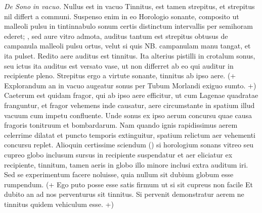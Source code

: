 \pstart [97 v\textsuperscript{o}]  \textit{De Sono}\protect{}\textit{ in vacuo.} Nullus est  in vacuo Tinnitus, est tamen strepitus, et strepitus  nil differt a communi. Suspenso enim in eo Horologio\protect{} sonante,  composito ut malleoli pulsu  in tintinnabulo sonum\protect{} certis distinctum intervallis  per semihoram ederet; , sed aure vitro admota, auditus tantum  est strepitus obtusus de campanula malleoli pulsu  ortus, velut si quis NB. campanulam manu tangat, et ita pulset. Redito aere auditus est tinnitus. Ita alterius pistilli in crotalum sonus\protect{}, seu  ictus ita auditus est versato vase, ut non differret  ab eo qui auditur in recipiente pleno. Strepitus  ergo a virtute sonante, tinnitus ab ipso aere.  (+ Explorandum an in vacuo augeatur sonus\protect{}  per Tubum Morlandi\protect{} exiguo sumto. +) Caeterum  est quidam fragor, qui ab ipso aere efficitur,  ut cum Lagenae quadratae franguntur, et fragor vehemens inde causatur, aere circumstante in spatium  illud vacuum cum impetu confluente. Unde sonus\protect{}  ex ipso aerum concursu quae causa fragoris tonitruum et bombardarum. Nam quando ignis rapidissimus aerem celerrime dilatat et puncto  temporis extinguitur, spatium relictum aer vehementi concursu replet. Alioquin certissime sciendum  (\Denarius ) si horologium\protect{} sonans vitreo seu cupreo globo  inclusum sursus in recipiente suspendatur et  aer eliciatur ex recipiente, tinnitum, tamen  aeris in globo illo minore inclusi extra auditum  iri. Sed se experimentum facere noluisse, quia  nullum sit dubium globum esse rumpendum. (+ Ego  puto posse esse satis firmum ut si sit cupreus  non facile  Et dubito an ad  nos perventurus sit tinnitus. Si pervenit  demonstratur aerem ne tinnitus quidem vehiculum esse. +)\pend

